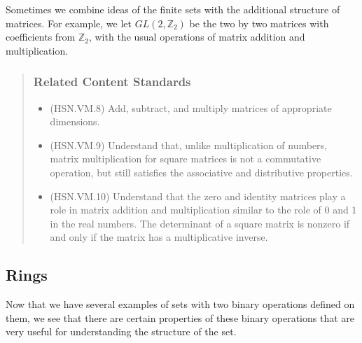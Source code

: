 \documentclass[
]{book}
\providecommand{\tightlist}{%
  \setlength{\itemsep}{0pt}\setlength{\parskip}{0pt}}
\theoremstyle{definition}
\theoremstyle{definition}
\theoremstyle{definition}
\theoremstyle{remark}
\begin{document}
Sometimes we combine ideas of the finite sets with the additional structure of matrices. For example, we let \(GL(2,\mathbb{Z}_2)\) be the two by two matrices with coefficients from \(\mathbb{Z}_2\), with the usual operations of matrix addition and multiplication.

\begin{quote}
\hypertarget{related-content-standards-26}{%
\subsubsection*{Related Content Standards}\label{related-content-standards-26}}

\begin{itemize}
\tightlist
\item
  (HSN.VM.8) Add, subtract, and multiply matrices of appropriate dimensions.
\item
  (HSN.VM.9) Understand that, unlike multiplication of numbers, matrix multiplication for square matrices is not a commutative operation, but still satisfies the associative and distributive properties.
\item
  (HSN.VM.10) Understand that the zero and identity matrices play a role in matrix addition and multiplication similar to the role of 0 and 1 in the real numbers. The determinant of a square matrix is nonzero if and only if the matrix has a multiplicative inverse.
\end{itemize}
\end{quote}

\hypertarget{rings}{%
\subsection{Rings}\label{rings}}

Now that we have several examples of sets with two binary operations defined on them, we see that there are certain properties of these binary operations that are very useful for understanding the structure of the set.
\end{document}
